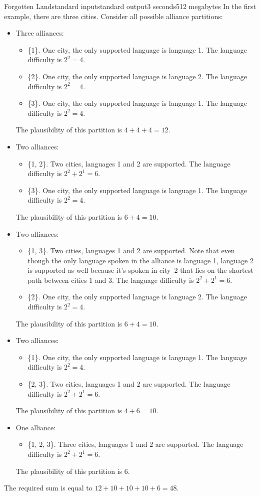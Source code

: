 \begin{problem}{Forgotten Land}{standard input}{standard output}{3 seconds}{512 megabytes}
\Note
In the first example, there are three cities. Consider all possible alliance partitions:

\begin{itemize}
\item {
 Three alliances:
 \begin{itemize}
  \item \{1\}. One city, the only supported language is language 1. The language difficulty is $2^2=4$.
  \item \{2\}. One city, the only supported language is language 2. The language difficulty is $2^2=4$.
  \item \{3\}. One city, the only supported language is language 1. The language difficulty is $2^2=4$.
 \end{itemize}
 The plausibility of this partition is $4+4+4=12$.
}
\item {
 Two alliances:
 \begin{itemize}
  \item \{1, 2\}. Two cities, languages 1 and 2 are supported. The language difficulty is $2^2+2^1=6$.
  \item \{3\}. One city, the only supported language is language 1. The language difficulty is $2^2=4$.
 \end{itemize}
 The plausibility of this partition is $6+4=10$.
}
\item {
 Two alliances:
 \begin{itemize}
  \item \{1, 3\}. Two cities, languages 1 and 2 are supported. Note that even though the only language spoken in the alliance is language 1, language 2 is supported as well because it's spoken in city~2 that lies on the shortest path between cities 1 and 3. The language difficulty is $2^2+2^1=6$.
  \item \{2\}. One city, the only supported language is language 2. The language difficulty is $2^2=4$.
 \end{itemize}
 The plausibility of this partition is $6+4=10$.
}
\item {
 Two alliances:
 \begin{itemize}
  \item \{1\}. One city, the only supported language is language 1. The language difficulty is $2^2=4$.
  \item \{2, 3\}. Two cities, languages 1 and 2 are supported. The language difficulty is $2^2+2^1=6$.
 \end{itemize}
 The plausibility of this partition is $4+6=10$.
}
\item {
 One alliance:
 \begin{itemize}
  \item \{1, 2, 3\}. Three cities, languages 1 and 2 are supported. The language difficulty is $2^2+2^1=6$.
 \end{itemize}
 The plausibility of this partition is $6$.
}
\end{itemize}

The required sum is equal to $12+10+10+10+6=48$.

\end{problem}

